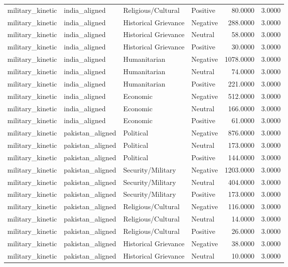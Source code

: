 \begin{longtable}{llllrr}
military\_kinetic & india\_aligned & Religious/Cultural & Positive & 80.0000 & 3.0000 \\
military\_kinetic & india\_aligned & Historical Grievance & Negative & 288.0000 & 3.0000 \\
military\_kinetic & india\_aligned & Historical Grievance & Neutral & 58.0000 & 3.0000 \\
military\_kinetic & india\_aligned & Historical Grievance & Positive & 30.0000 & 3.0000 \\
military\_kinetic & india\_aligned & Humanitarian & Negative & 1078.0000 & 3.0000 \\
military\_kinetic & india\_aligned & Humanitarian & Neutral & 74.0000 & 3.0000 \\
military\_kinetic & india\_aligned & Humanitarian & Positive & 221.0000 & 3.0000 \\
military\_kinetic & india\_aligned & Economic & Negative & 512.0000 & 3.0000 \\
military\_kinetic & india\_aligned & Economic & Neutral & 166.0000 & 3.0000 \\
military\_kinetic & india\_aligned & Economic & Positive & 61.0000 & 3.0000 \\
military\_kinetic & pakistan\_aligned & Political & Negative & 876.0000 & 3.0000 \\
military\_kinetic & pakistan\_aligned & Political & Neutral & 173.0000 & 3.0000 \\
military\_kinetic & pakistan\_aligned & Political & Positive & 144.0000 & 3.0000 \\
military\_kinetic & pakistan\_aligned & Security/Military & Negative & 1203.0000 & 3.0000 \\
military\_kinetic & pakistan\_aligned & Security/Military & Neutral & 404.0000 & 3.0000 \\
military\_kinetic & pakistan\_aligned & Security/Military & Positive & 173.0000 & 3.0000 \\
military\_kinetic & pakistan\_aligned & Religious/Cultural & Negative & 116.0000 & 3.0000 \\
military\_kinetic & pakistan\_aligned & Religious/Cultural & Neutral & 14.0000 & 3.0000 \\
military\_kinetic & pakistan\_aligned & Religious/Cultural & Positive & 26.0000 & 3.0000 \\
military\_kinetic & pakistan\_aligned & Historical Grievance & Negative & 38.0000 & 3.0000 \\
military\_kinetic & pakistan\_aligned & Historical Grievance & Neutral & 10.0000 & 3.0000 \\

\end{longtable}
